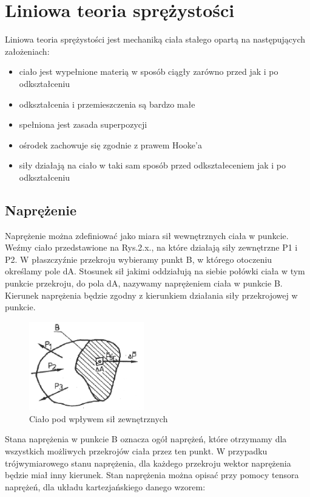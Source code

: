 
\section{Liniowa teoria sprężystości}
\label{sec:liniowa_teoria_sprezystosci}

Liniowa teoria sprężystości jest mechaniką ciała stałego opartą na następujących założeniach:
\begin{itemize}
  \item ciało jest wypełnione materią w sposób ciągły zarówno przed jak i po odkształceniu
  \item odkształcenia i przemieszczenia są bardzo małe
  \item spełniona jest zasada superpozycji
  \item ośrodek zachowuje się zgodnie z prawem Hooke'a
  \item siły działają na ciało w taki sam sposób przed odkształeceniem jak i po odkształceniu
\end{itemize}

\subsection{Naprężenie}
\label{sec:naprezenie}

Naprężenie można zdefiniować jako miara sił wewnętrznych ciała w punkcie. Weźmy ciało przedstawione na Rys.2.x., na które działają siły zewnętrzne P1 i P2. W płaszczyźnie przekroju wybieramy punkt B, w którego otoczeniu określamy pole dA. Stosunek sił jakimi oddziałują na siebie połówki ciała w tym punkcie przekroju, do pola dA, nazywamy naprężeniem ciała w punkcie B. Kierunek naprężenia będzie zgodny z kierunkiem działania siły przekrojowej w punkcie.

\begin{figure}[h]
\centering
\includegraphics[width=5cm]{Zdjecia/2/potato}
\caption{Ciało pod wpływem sił zewnętrznych}
\label{fig:potato}
\end{figure}

Stana naprężenia w punkcie B oznacza ogół naprężeń, które otrzymamy dla wszystkich możliwych przekrojów ciała przez ten punkt.
W przypadku trójwymiarowego stanu naprężenia, dla każdego przekroju wektor naprężenia będzie miał inny kierunek. Stan naprężenia można opisać przy pomocy tensora naprężeń, dla układu kartezjańskiego danego wzorem:


